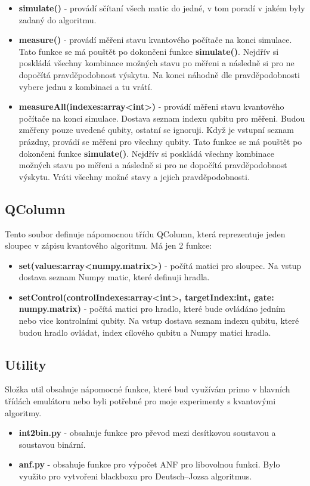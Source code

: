 \documentclass[11pt]{article}
\begin{document}
\begin{itemize}
    \item \textbf{simulate()} - provádí sčítaní všech matic do jedné, v tom poradí v jakém byly zadaný do algoritmu.
    \item \textbf{measure()} - provádí měřeni stavu kvantového počítače na konci simulace.
          Tato funkce se má pouštět po dokončeni funkce \textbf{simulate()}.
          Nejdřív si poskládá všechny kombinace možných stavu po měřeni a následně si pro ne dopočítá pravděpodobnost výskytu.
          Na konci náhodně dle pravděpodobnosti vybere jednu z kombinaci a tu vrátí.
    \item \textbf{measureAll(indexes:array<int>)} - provádí měřeni stavu kvantového počítače na konci simulace.
          Dostava seznam indexu qubitu pro měřeni.
          Budou změřeny pouze uvedené qubity, ostatní se ignoruji.
          Když je vstupní seznam prázdny, provádí se měřeni pro všechny qubity.
          Tato funkce se má pouštět po dokončeni funkce \textbf{simulate()}.
          Nejdřív si poskládá všechny kombinace možných stavu po měřeni a následně si pro ne dopočítá pravděpodobnost výskytu.
          Vráti všechny možné stavy a jejich pravděpodobnosti.
\end{itemize}
\subsection{QColumn}
Tento soubor definuje nápomocnou třídu QColumn, která reprezentuje jeden sloupec v zápisu kvantového algoritmu.
Má jen 2 funkce:
\begin{itemize}
    \item \textbf{set(values:array<numpy.matrix>)} - počítá matici pro sloupec.
          Na vstup dostava seznam Numpy matic, které definuji hradla.
    \item \textbf{setControl(controlIndexes:array<int>, targetIndex:int, gate: numpy.matrix)} - počítá matici pro hradlo, které bude ovládáno jedním nebo vice kontrolními qubity.
          Na vstup dostava seznam indexu qubitu, které budou hradlo ovládat, index cílového qubitu a Numpy matici hradla.
\end{itemize}

\subsection{Utility}
Složka util obsahuje nápomocné funkce, které bud využívám primo v hlavních třídách emulátoru nebo byli potřebné pro moje experimenty s kvantovými algoritmy.
\begin{itemize}
    \item \textbf{int2bin.py} - obsahuje funkce pro převod mezi desítkovou soustavou a soustavou binární.
    \item \textbf{anf.py} - obsahuje funkce pro výpočet ANF pro libovolnou funkci.
          Bylo využito pro vytvořeni blackboxu pro Deutsch–Jozsa algoritmus.
\end{itemize}
\end{document}
